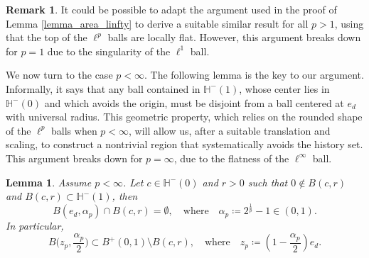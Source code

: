 \documentclass[a4paper, 11pt]{article}
\theoremstyle{plain}
\newtheorem{Lemma}[Theorem]{Lemma}
\theoremstyle{definition}
\newtheorem{Remark}[Theorem]{Remark}
\numberwithin{equation}{section}
\begin{document}
\begin{Remark}
    It could be possible to adapt the argument used in the proof of Lemma \ref{lemma_area_linfty} to derive a suitable similar result for all $p>1$, using that the top of the $\ell^p$ balls are locally flat. However, this argument breaks down for $p=1$ due to the singularity of the $\ell^1$ ball.
\end{Remark}


We now turn to the case $p<\infty$. The following lemma is the key to our argument. Informally, it says that any ball contained in $\mathbb H^-(1)$, whose center lies in $\mathbb H^-(0)$ and which avoids the origin, must be disjoint from a ball centered at $e_d$ with universal radius. This geometric property, which relies on the rounded shape of the $\ell^p$ balls when $p<\infty$, will allow us, after a suitable translation and scaling, to construct a nontrivial region that systematically avoids the history set. This argument breaks down for $p=\infty$, due to the flatness of the $\ell^\infty$ ball.


\begin{Lemma}
    \label{lemma_empty_ball}
    Assume $p<\infty$. Let $c\in\mathbb H^-(0)$ and $r>0$ such that $0\notin B(c,r)$ and $B(c, r)\subset\mathbb H^-(1)$, then
        \[B(e_d, \alpha_p)\cap B(c, r)=\emptyset,\quad\text{where}\quad \alpha_p\coloneqq2^{\frac{1}{p}}-1\in(0,1).\]
    In particular, 
        \[B\Big(z_p, \frac{\alpha_p}{2}\Big)\subset B^+(0,1)\setminus B(c, r),\quad\text{where}\quad z_p\coloneqq\left(1-\frac{\alpha_p}{2}\right)e_d.\]
\end{Lemma}
\end{document}
